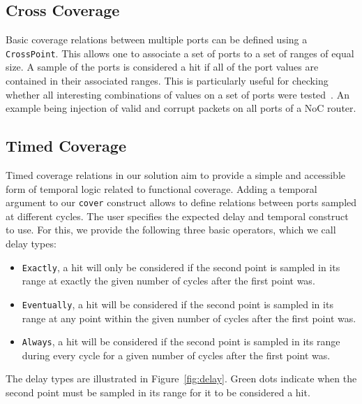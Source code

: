 \documentclass[conference]{IEEEtran}
\begin{document}
\subsection{Cross Coverage}
Basic coverage relations between multiple ports can be defined using a \texttt{CrossPoint}. 
This allows one to associate a set of ports to a set of ranges of equal size.  
A sample of the ports is considered a hit if all of the port values are contained in their associated ranges. This is particularly useful for checking whether all interesting combinations of values on a set of ports were tested~\cite{hdlverify}. An example being injection of valid and corrupt packets on all ports of a NoC router. %

\subsection{Timed Coverage}
Timed coverage relations in our solution aim to provide a simple and accessible form of temporal logic related to functional coverage. Adding a temporal argument to our \texttt{cover} construct allows to define relations between ports sampled at different cycles. The user specifies the expected delay and temporal construct to use. For this, we provide the following three basic operators, which we call delay types:%
\begin{itemize}
 \item \texttt{Exactly}, a hit will only be considered if the second point is sampled in its range at exactly the given number of cycles after the first point was.
 \item \texttt{Eventually}, a hit will be considered if the second point is sampled in its range at any point within the given number of cycles after the first point was.  
 \item \texttt{Always}, a hit will be considered if the second point is sampled in its range during every cycle for a given number of cycles after the first point was.
\end{itemize}  
The delay types are illustrated in Figure~\ref{fig:delay}. Green dots indicate when the second point must be sampled in its range for it to be considered a hit. %
\end{document}
